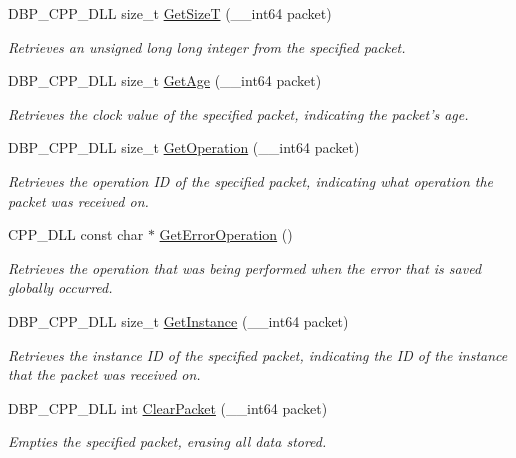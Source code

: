\begin{DoxyCompactItemize}
DBP\_\-CPP\_\-DLL size\_\-t \hyperlink{namespacemn_aca38e8b5229e1e4d13a0d904685c5af8}{GetSizeT} (\_\-\_\-int64 packet)
\begin{DoxyCompactList}\small\item\em Retrieves an unsigned long long integer from the specified packet. \item\end{DoxyCompactList}\item 
DBP\_\-CPP\_\-DLL size\_\-t \hyperlink{namespacemn_a6155af5ab3e18ae4746b1b9c06ee6509}{GetAge} (\_\-\_\-int64 packet)
\begin{DoxyCompactList}\small\item\em Retrieves the clock value of the specified packet, indicating the packet's age. \item\end{DoxyCompactList}\item 
DBP\_\-CPP\_\-DLL size\_\-t \hyperlink{namespacemn_ac9394252d9c10089e465248ff97a0b17}{GetOperation} (\_\-\_\-int64 packet)
\begin{DoxyCompactList}\small\item\em Retrieves the operation ID of the specified packet, indicating what operation the packet was received on. \item\end{DoxyCompactList}\item 
CPP\_\-DLL const char $\ast$ \hyperlink{namespacemn_a0a6d7eb9d9bf8b6013de4497c410c824}{GetErrorOperation} ()
\begin{DoxyCompactList}\small\item\em Retrieves the operation that was being performed when the error that is saved globally occurred. \item\end{DoxyCompactList}\item 
DBP\_\-CPP\_\-DLL size\_\-t \hyperlink{namespacemn_ae9a66f2cfec02b7b48d162c614fc1c75}{GetInstance} (\_\-\_\-int64 packet)
\begin{DoxyCompactList}\small\item\em Retrieves the instance ID of the specified packet, indicating the ID of the instance that the packet was received on. \item\end{DoxyCompactList}\item 
DBP\_\-CPP\_\-DLL int \hyperlink{namespacemn_a2d701ece0f90e9234eb8bd9cf67691b3}{ClearPacket} (\_\-\_\-int64 packet)
\begin{DoxyCompactList}\small\item\em Empties the specified packet, erasing all data stored. \item\end{DoxyCompactList}\item 

\end{DoxyCompactItemize}
